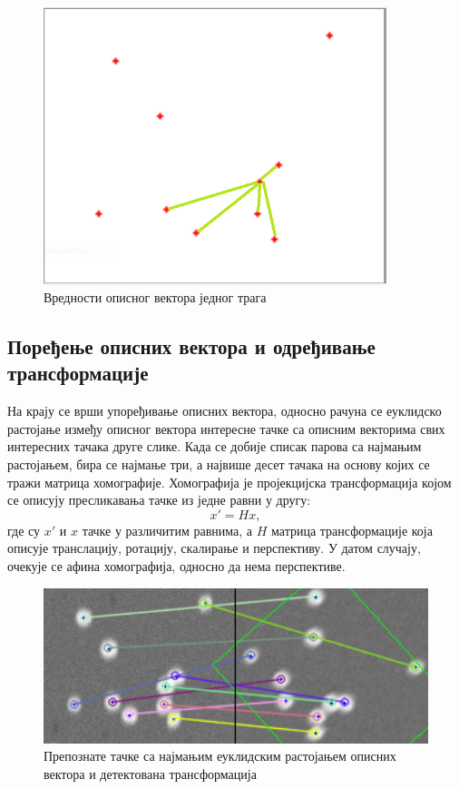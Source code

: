 \documentclass[11pt,a4paper,serbian,oneside]{book}
\begin{document}
\begin{figure}
\begin{center}
\includegraphics[width=100mm]{images/desc.png}
\end{center}
\caption{Вредности описног вектора једног трага}
\label{fig:desc}
\end{figure}

\subsection{Поређење описних вектора и одређивање трансформације}

На крају се врши упоређивање описних вектора, односно рачуна се еуклидско растојање између описног вектора интересне тачке са описним векторима свих интересних тачака друге слике.  Када се добије списак парова са најмањим растојањем, бира се најмање три, а највише десет тачака на основу којих се тражи матрица хомографије. Хомографија је пројекцијска трансформација којом се описују пресликавања тачке из једне равни у другу:
\begin{equation}
x \prime = H x,
\end{equation}
где су $x\prime$ и $x$ тачке у различитим равнима, а $H$ матрица трансформације која описује транслацију, ротацију, скалирање и перспективу. У датом случају, очекује се афина хо\-мо\-гра\-фи\-ја, односно да нема перспективе.

\begin{figure}[h]
\begin{center}
\includegraphics[width=150mm]{images/rotation.png}
\end{center}
\caption{Препознате тачке са најмањим еуклидским растојањем описних вектора и детектована трансформација}
\label{fig:rotation}
\end{figure}
\end{document}
